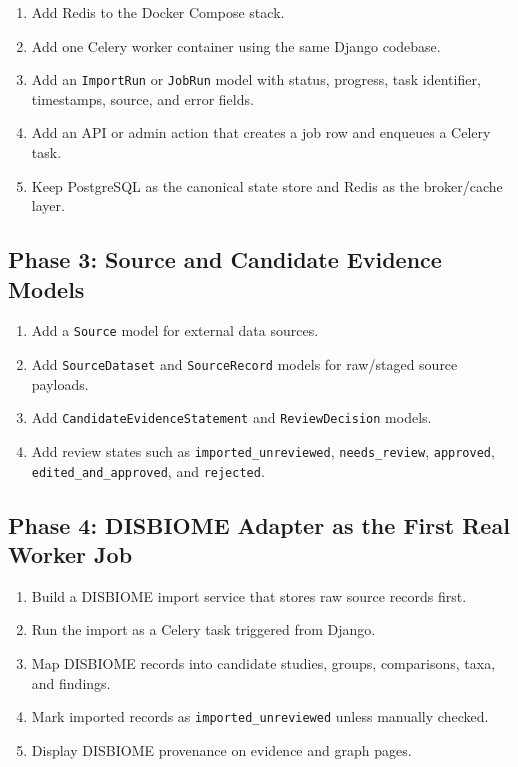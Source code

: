 \documentclass[11pt,a4paper]{article}
\begin{document}
\begin{enumerate}[noitemsep]
    \item Add Redis to the Docker Compose stack.
    \item Add one Celery worker container using the same Django codebase.
    \item Add an \texttt{ImportRun} or \texttt{JobRun} model with status, progress, task identifier, timestamps, source, and error fields.
    \item Add an API or admin action that creates a job row and enqueues a Celery task.
    \item Keep PostgreSQL as the canonical state store and Redis as the broker/cache layer.
\end{enumerate}

\subsection{Phase 3: Source and Candidate Evidence Models}

\begin{enumerate}[noitemsep]
    \item Add a \texttt{Source} model for external data sources.
    \item Add \texttt{SourceDataset} and \texttt{SourceRecord} models for raw/staged source payloads.
    \item Add \texttt{CandidateEvidenceStatement} and \texttt{ReviewDecision} models.
    \item Add review states such as \texttt{imported\_unreviewed}, \texttt{needs\_review}, \texttt{approved}, \texttt{edited\_and\_approved}, and \texttt{rejected}.
\end{enumerate}

\subsection{Phase 4: DISBIOME Adapter as the First Real Worker Job}

\begin{enumerate}[noitemsep]
    \item Build a DISBIOME import service that stores raw source records first.
    \item Run the import as a Celery task triggered from Django.
    \item Map DISBIOME records into candidate studies, groups, comparisons, taxa, and findings.
    \item Mark imported records as \texttt{imported\_unreviewed} unless manually checked.
    \item Display DISBIOME provenance on evidence and graph pages.
\end{enumerate}
\end{document}
